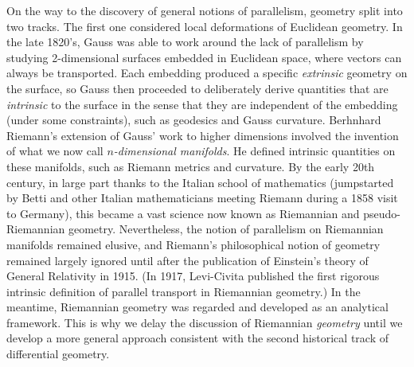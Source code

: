 \begin{hrem*}
    On the way to the discovery of general notions of parallelism, geometry split into two tracks. The first one considered local deformations of Euclidean geometry. In the late 1820's, Gauss was able to work around the lack of parallelism by studying 2-dimensional surfaces embedded in Euclidean space, where vectors can always be transported. Each embedding produced a specific \emph{extrinsic} geometry on the surface, so Gauss then proceeded to deliberately derive quantities that are \emph{intrinsic} to the surface in the sense that they are independent of the embedding (under some constraints), such as geodesics and Gauss curvature. Berhnhard Riemann's extension of Gauss' work to higher dimensions involved the invention of what we now call \emph{$n$-dimensional manifolds}. He defined intrinsic quantities on these manifolds, such as Riemann metrics and curvature. By the early 20th century, in large part thanks to the Italian school of mathematics (jumpstarted by Betti and other Italian mathematicians meeting Riemann during a 1858 visit to Germany), this became a vast science now known as Riemannian and pseudo-Riemannian geometry. Nevertheless, the notion of parallelism on Riemannian manifolds remained elusive, and Riemann's philosophical notion of geometry remained largely ignored until after the publication of Einstein's theory of General Relativity in 1915. (In 1917, Levi-Civita published the first rigorous intrinsic definition of parallel transport in Riemannian geometry.) In the meantime, Riemannian geometry was regarded and developed as an analytical framework. This is why we delay the discussion of Riemannian \emph{geometry} until we develop a more general approach consistent with the second historical track of differential geometry.


\end{hrem*}

